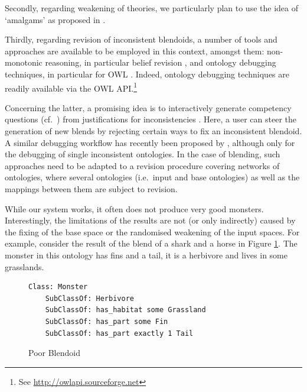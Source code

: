 \documentclass{ecai2012}
\begin{document}
Secondly, regarding weakening of theories, we particularly plan to use the idea of `amalgams' as proposed in \cite{ontanon2010amalgams}. 

Thirdly, regarding revision of inconsistent blendoids, a number of tools and approaches are available to be employed in this context, amongst them: non-monotonic reasoning, in particular belief revision \citep{Alchourron85a}, and ontology debugging techniques, in particular for OWL \citep{Kaly05}. Indeed, ontology debugging techniques are readily available via the OWL API.\footnote{See \url{http://owlapi.sourceforge.net}} %

 Concerning the latter, a promising idea is to interactively generate competency questions (cf.\ \cite{gruninger1995role,ren2014towards}) from justifications for inconsistencies \citep{Kalyanpur:2007:Finding}. Here, a user can steer the generation of new blends by rejecting certain ways to fix an inconsistent blendoid. A similar debugging workflow has recently been proposed by \cite{intontdebug14}, although only for the debugging of single inconsistent ontologies. In the case of blending, such approaches need to be adapted to a revision procedure covering networks of ontologies, where several ontologies (i.e.\ input and base ontologies) as well as the mappings between them are subject to revision.






While our system works, it often does not produce very  good monsters. 
Interestingly, the limitations of the results are not (or only indirectly) caused
 by the fixing of the base space or the randomised weakening of the input spaces. 
 For example, consider the result of the blend of a shark and a horse in Figure \ref{outputExample}. 
 The monster in this ontology has  fins and a tail,  it is a  herbivore and  lives in some grasslands. 
 \begin{figure}[htbp]
\begin{lstlisting}[basicstyle=\ttfamily\scriptsize,language=dolText,morekeywords={props,excluding,ObjectProperty,
Class,DisjointUnionOf,SubClassOf,Characteristics,Transitive,Asymmetric,SubPropertyOf,
DisjointClasses,EquivalentTo,Asymmetric,inverse,only,forall,iff,if,or,exists,
bridge,distributed},escapechar=@,mathescape,alsolanguage=owl2Manchester]
Class: Monster
	SubClassOf: Herbivore 
	SubClassOf: has_habitat some Grassland
	SubClassOf: has_part some Fin 
	SubClassOf: has_part exactly 1 Tail  
\end{lstlisting}
\caption{Poor Blendoid}
\label{outputExample}
\end{figure}
\vspace{-2em}
\end{document}

